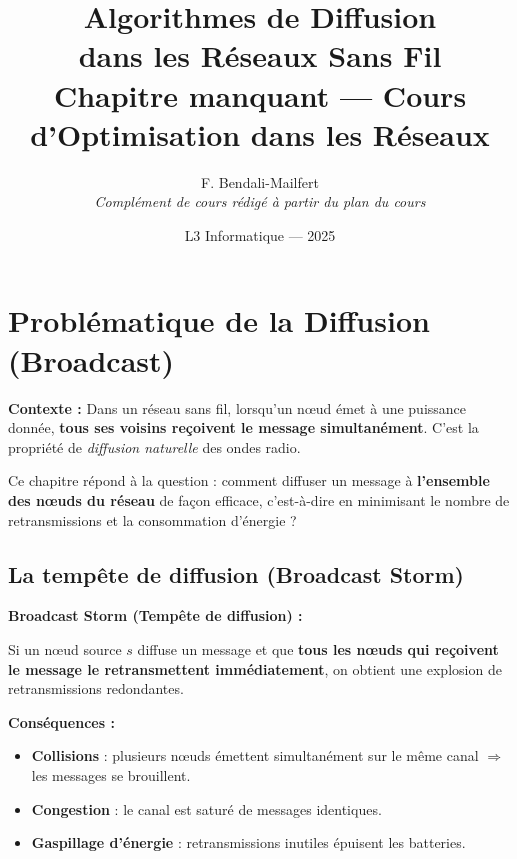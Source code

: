 \documentclass[12pt,a4paper]{article}
\title{\textbf{\Huge\color{titrebleu}Algorithmes de Diffusion}\\[0.5em]
\textbf{\Large\color{defvert}dans les Réseaux Sans Fil}\\[0.5em]
\large\color{algoviolet}Chapitre manquant --- Cours d'Optimisation dans les Réseaux}
\author{\large F. Bendali-Mailfert\\
\textit{Complément de cours rédigé à partir du plan du cours}}
\date{\large L3 Informatique --- 2025}
\begin{document}
\maketitle
\tableofcontents
\newpage

\section{Problématique de la Diffusion (Broadcast)}

\begin{notecours}
\textbf{Contexte :}
Dans un réseau sans fil, lorsqu'un nœud émet à une puissance donnée, \textbf{tous ses voisins reçoivent
le message simultanément}. C'est la propriété de \emph{diffusion naturelle} des ondes radio.

Ce chapitre répond à la question : comment diffuser un message à \textbf{l'ensemble des nœuds du
réseau} de façon efficace, c'est-à-dire en minimisant le nombre de retransmissions et la
consommation d'énergie ?
\end{notecours}

\subsection{La tempête de diffusion (Broadcast Storm)}

\begin{definition}
\textbf{Broadcast Storm (Tempête de diffusion) :}

Si un nœud source $s$ diffuse un message et que \textbf{tous les nœuds qui reçoivent le message le
retransmettent immédiatement}, on obtient une explosion de retransmissions redondantes.

\textbf{Conséquences :}
\begin{itemize}
    \item \textcolor{importantrouge}{\textbf{Collisions}} : plusieurs nœuds émettent simultanément
          sur le même canal $\Rightarrow$ les messages se brouillent.
    \item \textcolor{importantrouge}{\textbf{Congestion}} : le canal est saturé de messages
          identiques.
    \item \textcolor{importantrouge}{\textbf{Gaspillage d'énergie}} : retransmissions inutiles
          épuisent les batteries.
\end{itemize}
\end{definition}
\end{document}
